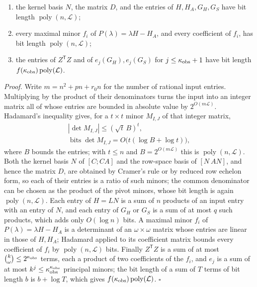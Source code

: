 \documentclass[journal]{IEEEtran}
\theoremstyle{plainn}
\theoremstyle{remark}
\begin{document}
\begin{enumerate}
\item the kernel basis $N$, the matrix $D$, and the entries of $H,H_A,G_H,G_S$ have bit length $\operatorname{poly}(n,\mathcal L)$;
\item every maximal minor $f_i$ of $P(\lambda)=\lambda H-H_A$, and every coefficient of $f_i$, has bit length $\operatorname{poly}(n,\mathcal L)$;
\item the entries of $Z^{\mathsf T}Z$ and of $e_j(G_H),e_j(G_S)$ for $j\le\kappa_{\rm obs}+1$ have bit length $f(\kappa_{\rm obs})\operatorname{poly}(\mathcal L)$.
\end{enumerate}
\emph{Proof.} Write $m=n^2+pn+r_0n$ for the number of rational input entries. Multiplying by the product of their denominators turns the input into an integer matrix all of whose entries are bounded in absolute value by $2^{O(m\mathcal L)}$. Hadamard's inequality gives, for a $t\times t$ minor $M_{I,J}$ of that integer matrix,
\begin{equation}
\begin{gathered}|\det M_{I,J}|\le(\sqrt t\,B)^t,\\\operatorname{bits}\det M_{I,J}=O\bigl(t(\log B+\log t)\bigr),\end{gathered}
\end{equation}
where $B$ bounds the entries; with $t\le n$ and $B=2^{O(m\mathcal L)}$ this is $\operatorname{poly}(n,\mathcal L)$. Both the kernel basis $N$ of $[C;CA]$ and the row-space basis of $[N\ AN]$, and hence the matrix $D$, are obtained by Cramer's rule or by reduced row echelon form, so each of their entries is a ratio of such minors; the common denominator can be chosen as the product of the pivot minors, whose bit length is again $\operatorname{poly}(n,\mathcal L)$. Each entry of $H=LN$ is a sum of $n$ products of an input entry with an entry of $N$, and each entry of $G_H$ or $G_S$ is a sum of at most $q$ such products, which adds only $O(\log n)$ bits. A maximal minor $f_i$ of $P(\lambda)=\lambda H-H_A$ is a determinant of an $\omega\times\omega$ matrix whose entries are linear in those of $H,H_A$; Hadamard applied to its coefficient matrix bounds every coefficient of $f_i$ by $\operatorname{poly}(n,\mathcal L)$ bits. Finally $Z^{\mathsf T}Z$ is a sum of at most $\binom{k}{\omega}\le2^{\kappa_{\rm obs}}$ terms, each a product of two coefficients of the $f_i$, and $e_j$ is a sum of at most $k^{j}\le\kappa_{\rm obs}^{\kappa_{\rm obs}}$ principal minors; the bit length of a sum of $T$ terms of bit length $b$ is $b+\log T$, which gives $f(\kappa_{\rm obs})\operatorname{poly}(\mathcal L)$. $\square$
\end{document}
